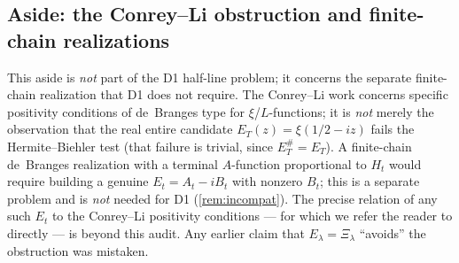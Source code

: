 \documentclass[12pt,a4paper]{amsart}
\theoremstyle{plain}
\theoremstyle{definition}
\begin{document}
\subsection{Aside: the Conrey--Li obstruction and finite-chain
realizations}

This aside is \emph{not} part of the D1 half-line problem; it concerns the
separate finite-chain realization that D1 does not require.  The
Conrey--Li work \cite{ConreyLi2000} concerns specific positivity
conditions of de~Branges type for $\xi$/$L$-functions; it is \emph{not}
merely the observation that the real entire candidate
$E_T(z)=\xi(1/2-iz)$ fails the Hermite--Biehler test (that failure is
trivial, since $E_T^\#=E_T$).  A finite-chain de~Branges realization with
a terminal $A$-function proportional to $H_t$ would require building a
genuine $E_t=A_t-iB_t$ with nonzero $B_t$; this is a separate problem and
is \emph{not} needed for D1 (\cref{rem:incompat}).  The precise relation
of any such $E_t$ to the Conrey--Li positivity conditions --- for which we
refer the reader to \cite{ConreyLi2000} directly --- is beyond this audit.
Any earlier claim that $E_\lambda = \Xi_\lambda$ ``avoids'' the
obstruction was mistaken.
\end{document}
